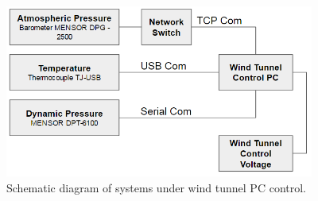 \begin{figure}[H]
\centering
\includegraphics[width=4in]{figs/setup/odulswt_control}
\caption{Schematic diagram of systems under wind tunnel PC control.}
\label{fig:control_diagram}
\end{figure}


